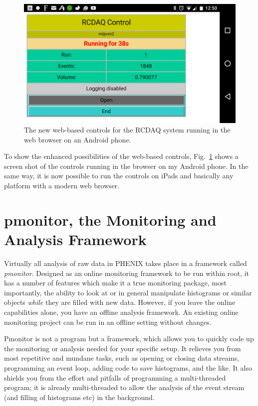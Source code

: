 \documentclass{article}[11pt]
\begin{document}
\begin{figure}[htb]
  \begin{center}
    \includegraphics[width=0.85\columnwidth]{android.png} 
  \end{center}
  \caption{\label{android}The new web-based controls for the RCDAQ system
    running in the web browser on an Android phone.}
\end{figure}

To show the enhanced possibilities of the web-based controls,
Fig.~\ref{android} shows a screen shot of the controls running in the
browser on my Android phone. In the same way, it is now possible to
run the controls on iPads and basically any platform with a modern web
browser.


\section{pmonitor, the Monitoring and Analysis Framework}

Virtually all analysis of raw data in PHENIX takes place in a
framework called \emph{pmonitor}. Designed as an online monitoring
framework to be run within root, it has a number of features which
make it a true monitoring package, most importantly, the ability to
look at or in general manipulate histograms or similar objects
\emph{while} they are filled with new data. However, if you leave the
online capabilities alone, you have an offline analysis framework. An
existing online monitoring project can be run in an offline setting
without changes.

Pmonitor is not a program but a framework, which allows you to quickly
code up the monitoring or analysis needed for your specific setup.  It
relieves you from most repetitive and mundane tasks, such as opening or
closing data streams, programming an event loop, adding code to save
histograms, and the like. It also shields you from the effort and
pitfalls of programming a multi-threaded program; it is already
multi-threaded to allow the analysis of the event stream (and filling
of histograms etc) in the background. 
\end{document}
